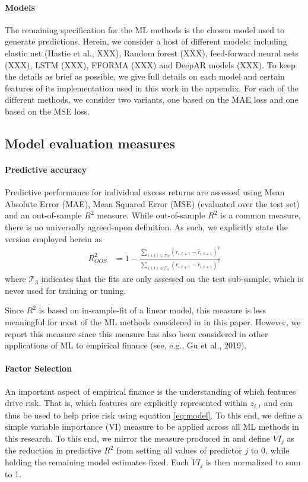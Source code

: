 \documentclass{article}
\begin{document}
\paragraph{Models} The remaining specification for the ML methods is the chosen model used to generate predictions. Herein, we consider a host of different models: including elastic net (Hastie et al., XXX), Random forest (XXX), feed-forward neural nets (XXX), LSTM (XXX), FFORMA (XXX) and DeepAR models (XXX). To keep the details as brief as possible, we give full details on each model and certain features of its implementation used in this work in the appendix. For each of the different methods, we consider two variants, one based on the MAE loss and one based on the MSE loss. 

\subsection{Model evaluation measures}
\paragraph{Predictive accuracy}

Predictive performance for individual excess returns are assessed using Mean Absolute Error (MAE), Mean Squared Error (MSE) (evaluated over the test set) and an out-of-sample $R^2$ measure. While  out-of-sample $R^2$ is a common measure, there is no universally agreed-upon definition. As such, we explicitly state the version employed herein as
\begin{align}
R^2_{OOS} &= 1 - \frac{\sum_{(i, t)\in\mathcal{T}_3}(r_{i, t+1} - \widehat{r}_{i, t+1})^2}
{\sum_{(i, t)\in\mathcal{T}_3} \left( r_{i, t+1} - \bar{r}_{i, t+1} \right) ^2}
\end{align}
where $\mathcal{T}_3$ indicates that the fits are only assessed on the test sub-sample, which is never used for training or tuning.

Since $R^2$ is based on in-sample-fit of a linear model, this measure is less meaningful for most of the ML methods considered in in this paper. However, we report this measure since this measure has also been considered in other applications of ML to empirical finance (see, e.g., Gu et al., 2019). 

\paragraph{Factor Selection}
An important aspect of empirical finance is the understanding of which features drive risk. That is, which features are explicitly represented within $z_{i,t}$ and can thus be used to help price risk using equation \ref{eq:model}. To this end, we define a simple variable importance (VI) measure to be applied across all ML methods in this research. To this end, we mirror the measure produced in \cite{gu_empirical_2018} and define $VI_j$ as the reduction in predictive $R^2$ from setting all values of predictor $j$ to 0, while holding the remaining model estimates fixed. Each $VI_j$ is then normalized to sum to 1. 
\end{document}
